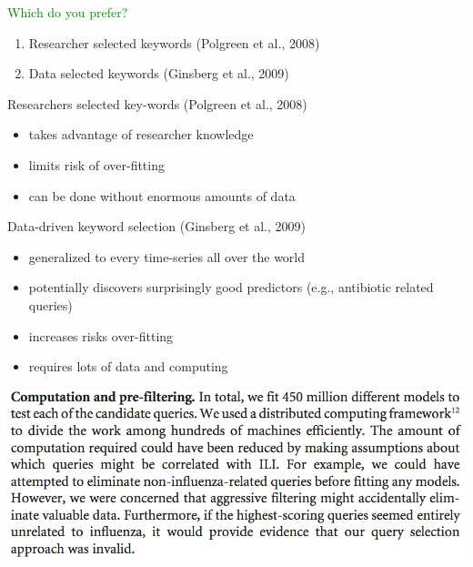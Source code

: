 \documentclass[aspectratio=169]{beamer}
\begin{document}
\begin{frame}

\textcolor{green}{Which do you prefer?}
\begin{enumerate}
\item Researcher selected keywords (Polgreen et al., 2008) 
\item Data selected keywords (Ginsberg et al., 2009)
\end{enumerate}

\end{frame}
\begin{frame}

Researchers selected key-words (Polgreen et al., 2008) 
\begin{itemize}
\item takes advantage of researcher knowledge
\item limits risk of over-fitting
\item can be done without enormous amounts of data
\end{itemize}

\pause

Data-driven keyword selection (Ginsberg et al., 2009)
\begin{itemize}
\item generalized to every time-series all over the world
\item potentially discovers surprisingly good predictors (e.g., antibiotic related queries)
\item increases risks over-fitting 
\item requires lots of data and computing
\end{itemize}

\end{frame}
\begin{frame}

\begin{center}
\includegraphics[width=\textwidth]{figures/ginsberg_detecting_2009_filtering}
\end{center}

\end{frame}
\end{document}
